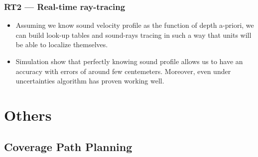 \documentclass[
    11pt, %
    aspectratio=169, %
]{beamer}
\begin{document}
\begin{frame}
    \frametitle{RT2 --- Real-time ray-tracing}
    \begin{itemize}
        \item Assuming we know sound velocity profile as the function of depth a-priori, we 
        can build look-up tables and sound-rays tracing in such a way that units will
        be able to localize themselves.
        \item Simulation show that perfectly knowing sound profile allows us to have
        an accuracy with errors of around few centemeters. Moreover, even under
        uncertainties algorithm has proven working well.
    \end{itemize}
\end{frame}

\section{Others}

\subsection{Coverage Path Planning}
\end{document}
